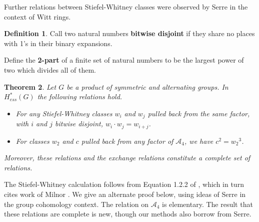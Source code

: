 \documentclass{article}
\theoremstyle{plain}
\newtheorem{theorem}{Theorem}
\theoremstyle{definition}
\newtheorem{definition}[theorem]{Definition}
\newcommand{\Z}{\mathbb{Z}}
\newcommand{\alt}{\mathcal{A}}
\begin{document}

Further relations between Stiefel-Whitney classes were  observed by Serre in the context of Witt rings.

\begin{definition}
    Call two natural numbers {\bf bitwise disjoint} if they share no places with 1’s
in their binary expansions.

Define the {\bf 2-part} of a finite set of natural
numbers to be the largest power of two which divides all
of them.
\end{definition}


\begin{theorem}\label{relations}
Let $G$ be a product
of symmetric and alternating groups.  In $H^*_{ess}(G )$
the following relations hold.
\begin{itemize}
    \item For any Stiefel-Whitney classes $w_i$ and $w_j$ pulled 
    back from the same factor,
    with $i$ and $j$ bitwise disjoint, $w_i \cdot w_j = w_{i+j}$.
    \item For classes $w_2$ and $c$ pulled back from any factor of $\alt_4$, we have $c^2 = {w_2}^3$.
\end{itemize}
Moreover, these relations and the exchange relations constitute
a complete set of relations.
\end{theorem}

The Stiefel-Whitney calculation follows from Equation 1.2.2 of \cite{Serre24}, which in turn cites work of Milnor \cite{miln70}.
We give an alternate proof below, using ideas of Serre in the group
cohomology context.
The relation on $\alt_4$ is elementary.  The result
that these relations are complete is new, though our methods
 also borrow from Serre.
\end{document}
